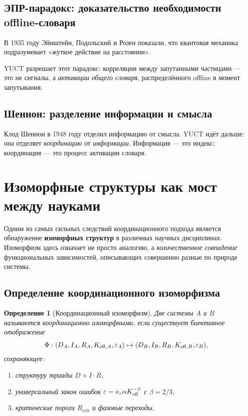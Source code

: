 \documentclass[12pt,a4paper]{article}
\newcommand{\kappac}{\kappa_c}
\newcommand{\eps}{\varepsilon}
\newcommand{\betaf}{\beta}
\newcommand{\Rcrit}{R_{\mathrm{crit}}}
\newtheorem{definition}{Определение}[section]
\begin{document}
	\subsection{ЭПР-парадокс: доказательство необходимости offline-словаря}
	
	В 1935 году Эйнштейн, Подольский и Розен показали, что квантовая механика подразумевает «жуткое действие на расстоянии».
	
	YUCT разрешает этот парадокс: корреляции между запутанными частицами — это не сигналы, а \emph{активации общего словаря}, распределённого offline в момент запутывания.
	
	\subsection{Шеннон: разделение информации и смысла}
	
	Клод Шеннон в 1948 году отделил информацию от смысла. YUCT идёт дальше: она отделяет \emph{координацию} от \emph{информации}. Информация — это индекс; координация — это процесс активации словаря.
	
	\section{Изоморфные структуры как мост между науками}
	\label{sec:isomorphisms}
	
	Одним из самых сильных следствий координационного подхода является обнаружение \textbf{изоморфных структур} в различных научных дисциплинах. Изоморфизм здесь означает не просто аналогию, а \emph{количественное совпадение} функциональных зависимостей, описывающих совершенно разные по природе системы.
	
	\subsection{Определение координационного изоморфизма}
	
	\begin{definition}[Координационный изоморфизм]
		Две системы \(A\) и \(B\) называются координационно изоморфными, если существует биективное отображение
		\[
		\Phi: (D_A, I_A, R_A, \Keff[A], \eps_A) \mapsto (D_B, I_B, R_B, \Keff[B], \eps_B),
		\]
		сохраняющее:
		\begin{enumerate}
			\item структуру триады \(D+I\cdot R\),
			\item универсальный закон ошибок \(\eps = \kappac \alpha \Keff^{-\betaf}\) с \(\betaf = 2/3\),
			\item критические пороги \(\Rcrit\) и фазовые переходы.
		\end{enumerate}
	\end{definition}
	
\end{document}
